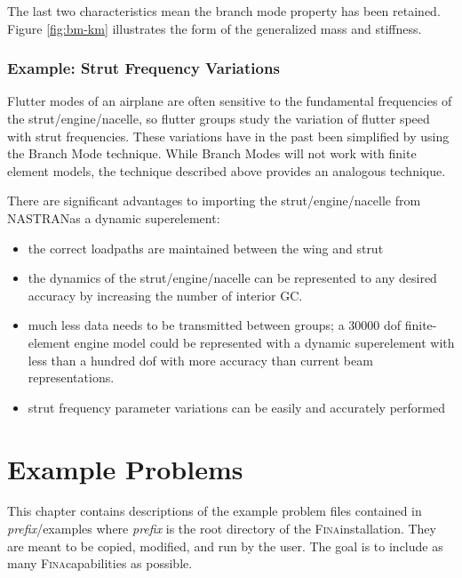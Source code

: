 \documentclass[10pt,openany,twoside]{book}
\numberwithin{equation}{section}   %
\newcommand{\Subst}[1]{{\sl\sf #1}}
\newcommand{\Fina}{{\normalfont\scshape Fina\:}}
\newcommand{\Nastran}{{\footnotesize{NASTRAN\:}}}
\newcommand{\Gc}{GC}
\begin{document}
The last two characteristics mean the branch mode property has been retained.
Figure \ref{fig:bm-km} illustrates the form of the generalized mass and stiffness.

\subsection{ Example: Strut Frequency Variations}
\par
Flutter modes of an airplane are often sensitive
to the fundamental frequencies of the strut/engine/nacelle,
so flutter groups study the variation of
flutter speed with strut frequencies.
These variations have in the past been simplified
by using the Branch Mode technique.
While Branch Modes will not work with finite element models,
the technique described above
provides an analogous technique.
\par
There are significant advantages to importing
the strut/engine/nacelle from \Nastran as a
dynamic superelement:

\begin{itemize}
\item
the correct loadpaths are maintained between
the wing and strut
\item
the dynamics of the strut/engine/nacelle can be
represented to any desired accuracy
by increasing the number of interior \Gc.
\item
much less data needs to be transmitted between groups;
a 30000 dof finite-element engine model could be represented
with a dynamic superelement with less than a hundred dof
with more accuracy than current beam representations.
\item
strut frequency parameter variations can be easily and
accurately performed
\end{itemize}


\newpage
\chapter{Example Problems}\label{chap:examples}
This chapter contains descriptions of the example problem files
contained in \Subst{prefix}/examples where \Subst{prefix} \index{prefix@\Subst{prefix}}
is the root directory of the \Fina installation.
They are meant to be copied, modified,
and run by the user. The goal is to include as many \Fina capabilities
as possible.
\end{document}
